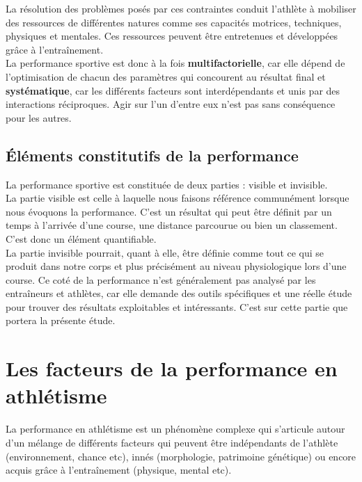             La résolution des problèmes posés par ces contraintes conduit l'athlète à mobiliser des ressources de différentes natures comme ses capacités motrices, techniques, physiques et mentales. Ces ressources peuvent être entretenues et développées grâce à l’entraînement.\\
            
            La performance sportive est donc à la fois \textbf{multifactorielle}, car elle dépend de l'optimisation de chacun des paramètres qui concourent au résultat final et \textbf{systématique}, car les différents facteurs sont interdépendants et unis par des interactions réciproques. Agir sur l'un d'entre eux n'est pas sans conséquence pour les autres.\\
            
        
        \subsection{Éléments constitutifs de la performance}
        
            La performance sportive est constituée de deux parties : visible et invisible.\\
            
            La partie visible est celle à laquelle nous faisons référence communément lorsque nous évoquons la performance. C'est un résultat qui peut être définit par un temps à l'arrivée d'une course, une distance parcourue ou bien un classement. C'est donc un élément quantifiable.\\
            
            La partie invisible pourrait, quant à elle, être définie comme tout ce qui se produit dans notre corps et plus précisément au niveau physiologique lors d'une course. Ce coté de la performance n'est généralement pas analysé par les entraîneurs et athlètes, car elle demande des outils spécifiques et une réelle étude pour trouver des résultats exploitables et intéressants. C'est sur cette partie que portera la présente étude. \\

    
    \section {Les facteurs de la performance en athlétisme}
    
        La performance en athlétisme est un phénomène complexe qui s’articule autour d'un mélange de différents facteurs qui peuvent être indépendants de l'athlète (environnement, chance etc), innés (morphologie, patrimoine génétique) ou encore acquis grâce à l'entraînement (physique, mental etc).\\
        
